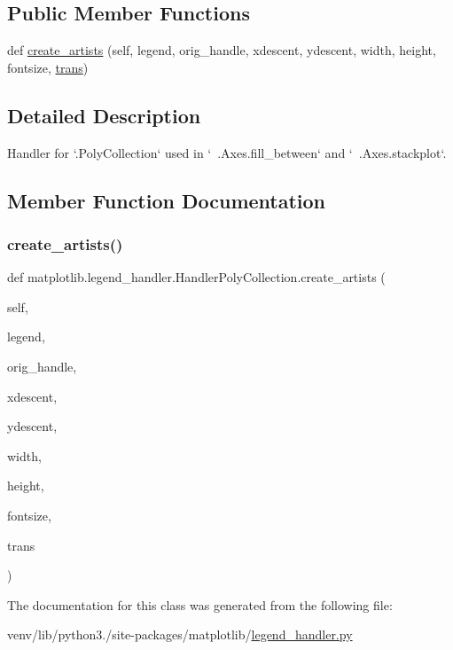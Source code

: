 \subsection*{Public Member Functions}
\begin{DoxyCompactItemize}
\item 
def \hyperlink{classmatplotlib_1_1legend__handler_1_1HandlerPolyCollection_a6bec30c99930db46ebaeb7ca8444be2b}{create\+\_\+artists} (self, legend, orig\+\_\+handle, xdescent, ydescent, width, height, fontsize, \hyperlink{size_2foo_8f90_afabfd8da71309850231a00e53c61f106}{trans})
\end{DoxyCompactItemize}


\subsection{Detailed Description}
\begin{DoxyVerb}Handler for `.PolyCollection` used in `~.Axes.fill_between` and
`~.Axes.stackplot`.
\end{DoxyVerb}
 

\subsection{Member Function Documentation}
\mbox{\label{classmatplotlib_1_1legend__handler_1_1HandlerPolyCollection_a6bec30c99930db46ebaeb7ca8444be2b}} 
\subsubsection{\texorpdfstring{create\+\_\+artists()}{create\_artists()}}
{\footnotesize\ttfamily def matplotlib.\+legend\+\_\+handler.\+Handler\+Poly\+Collection.\+create\+\_\+artists (\begin{DoxyParamCaption}\item[{}]{self,  }\item[{}]{legend,  }\item[{}]{orig\+\_\+handle,  }\item[{}]{xdescent,  }\item[{}]{ydescent,  }\item[{}]{width,  }\item[{}]{height,  }\item[{}]{fontsize,  }\item[{}]{trans }\end{DoxyParamCaption})}



The documentation for this class was generated from the following file\+:\begin{DoxyCompactItemize}
\item 
venv/lib/python3./site-\/packages/matplotlib/\hyperlink{legend__handler_8py}{legend\+\_\+handler.\+py}\end{DoxyCompactItemize}
